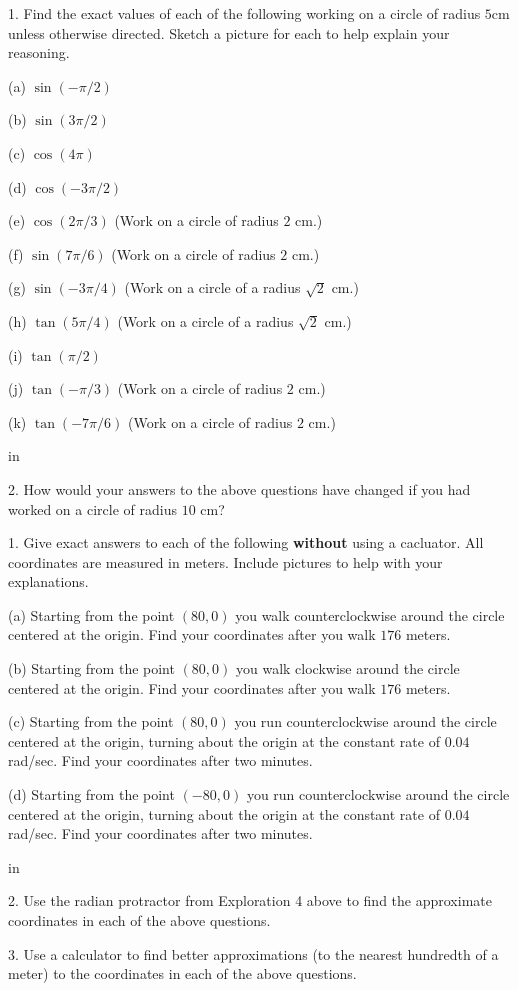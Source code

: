 \documentclass{ximera}
\newcommand{\pskip}{\vskip 0.1 in}
\begin{document}
\begin{question}  \label{Q346fr:Cosine}
1. Find the exact values of each of the following working on a circle of radius $5$cm unless otherwise directed. Sketch a picture for each to help explain your reasoning. 

(a) $\sin (-\pi/2)$

(b) $\sin(3\pi/2)$

(c) $\cos(4\pi)$

(d) $\cos(-3\pi/2)$

(e) $\cos (2\pi/3)$  (Work on a circle of radius $2$ cm.)

(f) $\sin(7\pi/6)$   (Work on a circle of radius $2$ cm.)

(g) $\sin(-3\pi/4)$   (Work on a circle of a radius $\sqrt{2}$ cm.)

(h) $\tan(5\pi/4)$  (Work on a circle of a radius $\sqrt{2}$ cm.)

(i) $\tan(\pi/2)$

(j) $\tan(-\pi/3)$ (Work on a circle of radius $2$ cm.)

(k) $\tan(-7\pi/6)$ (Work on a circle of radius $2$ cm.)

\pskip

2. How would your answers to the above questions have changed if you had worked on a circle of radius $10$ cm?

\end{question}


\begin{question}  \label{Q2354234:Cosine}
1. Give exact answers to each of the following {\bf without} using a cacluator. All coordinates are measured in meters. Include pictures to help with your explanations.

(a) Starting from the point $(80,0)$ you walk counterclockwise around the circle centered at the origin. Find your coordinates after you walk $176$ meters.

(b) Starting from the point $(80,0)$ you walk clockwise around the circle centered at the origin. Find your coordinates after you walk $176$ meters.

(c)  Starting from the point $(80,0)$ you run counterclockwise around the circle centered at the origin, turning about the origin at the constant rate of $0.04$ rad/sec. Find your coordinates after two minutes.

(d) Starting from the point $(-80,0)$ you run counterclockwise around the circle centered at the origin, turning about the origin at the constant rate of $0.04$ rad/sec. Find your coordinates after two minutes.

\pskip

2. Use the radian protractor from Exploration 4 above to find the approximate coordinates in each of the above questions.

3. Use a calculator to find better approximations (to the nearest hundredth of a meter) to the coordinates in each of the above questions.


\end{question}
\end{document}

